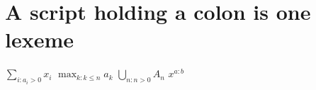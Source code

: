 \documentclass{article}
\begin{document}
\section{A script holding a colon is one lexeme}
$\sum_{i:a_i>0}x_i$ $\max_{k:k\le n}a_k$ $\bigcup_{n:n>0}A_n$ $x^{a:b}$
\end{document}
